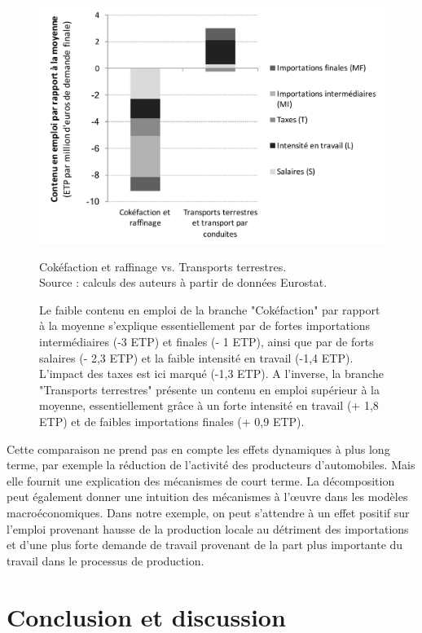 \begin{figure}[!ht]
	\centering
	\includegraphics[width=12cm]{figures/comparaison2.pdf}
	\caption{Cokéfaction et raffinage vs. Transports terrestres. \\
		Source : calculs des auteurs à partir de données Eurostat.}
	\label{fig:comparaison2}
	\captionsetup{justification=raggedright}
	\caption*{Le faible contenu en emploi de la branche "Cokéfaction" par rapport à la moyenne s'explique essentiellement par de fortes importations intermédiaires (-3 ETP) et finales (- 1 ETP), ainsi que par de forts salaires (- 2,3 ETP) et la faible intensité en travail (-1,4 ETP). L'impact des taxes est ici marqué (-1,3 ETP). A l'inverse, la branche "Transports terrestres" présente un contenu en emploi supérieur à la moyenne, essentiellement grâce à un forte intensité en travail (+ 1,8 ETP) et de faibles importations finales (+ 0,9 ETP).}
\end{figure}

Cette comparaison ne prend pas en compte les effets dynamiques à plus long terme, par exemple la réduction de l’activité des producteurs d’automobiles. Mais elle fournit une explication des mécanismes de court terme. La décomposition peut également donner une intuition des mécanismes à l’œuvre dans les modèles macroéconomiques. Dans notre exemple, on peut s'attendre à un effet positif sur l'emploi provenant hausse de la production locale au détriment des importations et d'une plus forte demande de travail provenant de la part plus importante du travail dans le processus de production.


\section{Conclusion et discussion}


